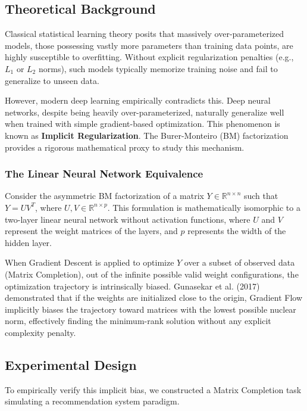\subsection{Theoretical Background}
Classical statistical learning theory posits that massively over-parameterized models, those possessing vastly more parameters than training data points, are highly susceptible to overfitting. Without explicit regularization penalties (e.g., $L_1$ or $L_2$ norms), such models typically memorize training noise and fail to generalize to unseen data.

However, modern deep learning empirically contradicts this. Deep neural networks, despite being heavily over-parameterized, naturally generalize well when trained with simple gradient-based optimization. This phenomenon is known as \textbf{Implicit Regularization}. The Burer-Monteiro (BM) factorization provides a rigorous mathematical proxy to study this mechanism.

\subsubsection{The Linear Neural Network Equivalence}
Consider the asymmetric BM factorization of a matrix $Y \in \mathbb{R}^{n \times n}$ such that $Y = UV^T$, where $U, V \in \mathbb{R}^{n \times p}$. This formulation is mathematically isomorphic to a two-layer linear neural network without activation functions, where $U$ and $V$ represent the weight matrices of the layers, and $p$ represents the width of the hidden layer.

When Gradient Descent is applied to optimize $Y$ over a subset of observed data (Matrix Completion), out of the infinite possible valid weight configurations, the optimization trajectory is intrinsically biased. Gunasekar et al. (2017) demonstrated that if the weights are initialized close to the origin, Gradient Flow implicitly biases the trajectory toward matrices with the lowest possible nuclear norm, effectively finding the minimum-rank solution without any explicit complexity penalty.

\subsection{Experimental Design}
To empirically verify this implicit bias, we constructed a Matrix Completion task simulating a recommendation system paradigm.


